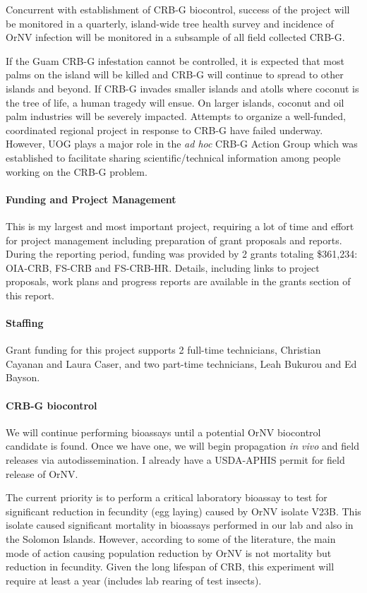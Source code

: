 \begin{refsection}
Concurrent with establishment of CRB-G biocontrol, success of the
project will be monitored in a quarterly, island-wide tree health
survey and incidence of OrNV infection will be monitored in a subsample
of all field collected CRB-G.

If the Guam CRB-G infestation cannot be controlled, it is expected
that most palms on the island will be killed and CRB-G will continue
to spread to other islands and beyond. If CRB-G invades smaller islands
and atolls where coconut is the tree of life, a human tragedy will
ensue. On larger islands, coconut and oil palm industries will be
severely impacted. Attempts to organize a well-funded, coordinated regional project in response to CRB-G have failed underway. However, UOG plays a major role in the \textit{ad hoc} CRB-G Action Group which was established to facilitate sharing scientific/technical information among people working on the CRB-G problem.

\paragraph{Funding and Project Management} This is my largest and most important project, requiring a lot of time and effort for project management including preparation of grant proposals and reports. During the reporting period, funding was provided by 2 grants totaling \$361,234: OIA-CRB, FS-CRB and FS-CRB-HR.  Details, including links to project proposals, work plans and progress reports are available in the grants section of this report.

\paragraph{Staffing}

Grant funding for this project supports 2 full-time technicians, Christian Cayanan and Laura Caser, and two part-time technicians, Leah Bukurou and Ed Bayson.

\paragraph{CRB-G biocontrol} 

We will continue performing bioassays until a potential OrNV biocontrol candidate is found. Once we have one, we will begin propagation \textit{in vivo} and field releases via autodissemination. I already have a USDA-APHIS permit for field release of OrNV.

The current priority is to perform a critical laboratory bioassay to test for significant reduction in fecundity (egg laying) caused by OrNV isolate V23B. This isolate caused significant mortality in bioassays performed in our lab and also in the Solomon Islands. However, according to some of the literature, the main mode of action causing population reduction by OrNV is not mortality but reduction in fecundity. Given the long lifespan of CRB, this experiment will require at least a year (includes lab rearing of test insects).


\end{refsection}
